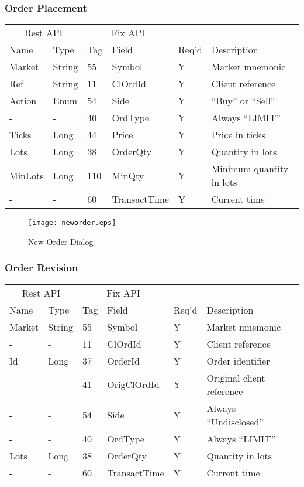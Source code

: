 \documentclass[11pt,a4paper]{article}
\begin{document}
\subsubsection{Order Placement}

\vspace{5mm}
\begin{tabular}{ll|ll|ll}
\multicolumn{2}{c}{Rest API}&\multicolumn{2}{c}{Fix API}\\
Name&Type&Tag&Field&Req'd&Description\\
\hline
Market&String&55&Symbol&Y&Market mnemonic\\
Ref&String&11&ClOrdId&Y&Client reference\\
Action&Enum&54&Side&Y&``Buy'' or ``Sell''\\
-&-&40&OrdType&Y&Always ``LIMIT''\\
Ticks&Long&44&Price&Y&Price in ticks\\
Lots&Long&38&OrderQty&Y&Quantity in lots\\
MinLots&Long&110&MinQty&Y&Minimum quantity in lots\\
-&-&60&TransactTime&Y&Current time\\
\end{tabular}
\vspace{5mm}

\begin{figure}[H]
\centering
\texttt{[image: neworder.eps]}
\caption{New Order Dialog}
\end{figure}

\subsubsection{Order Revision}

\vspace{5mm}
\begin{tabular}{ll|ll|ll}
\multicolumn{2}{c}{Rest API}&\multicolumn{2}{c}{Fix API}\\
Name&Type&Tag&Field&Req'd&Description\\
\hline
Market&String&55&Symbol&Y&Market mnemonic\\
-&-&11&ClOrdId&Y&Client reference\\
Id&Long&37&OrderId&Y&Order identifier\\
-&-&41&OrigClOrdId&Y&Original client reference\\
-&-&54&Side&Y&Always ``Undisclosed''\\
-&-&40&OrdType&Y&Always ``LIMIT''\\
Lots&Long&38&OrderQty&Y&Quantity in lots\\
-&-&60&TransactTime&Y&Current time\\
\end{tabular}
\vspace{5mm}
\end{document}
